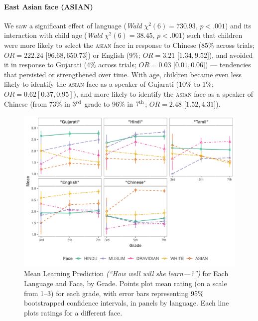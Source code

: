 \documentclass{foushee-adapted-preprint}
\begin{document}
\paragraph*{East Asian face {\small{(ASIAN)}}} 
We saw a significant effect of language (\textit{Wald} $\chi^2(6)=730.93$, $p<.001$) and its interaction with child age (\textit{Wald} $\chi^2(6)=38.45$, $p<.001$) such that children were more likely to select the \textsc{asian} face in response to Chinese (85\% across trials; $OR=222.24$ [$96.68, 650.73]$) or English (9\%; $OR=3.21$ [$1.34, 9.52]$), and avoided it in response to Gujarati (4\% across trials; $OR=0.03$ [$0.01, 0.06]$) --- tendencies that persisted or strengthened over time. With age, children became even less likely to identify the \textsc{asian} face as a speaker of Gujarati (10\% to 1\%; $OR=0.62 [0.37, 0.95]$), and more likely to identify the \textsc{asian} face as a speaker of Chinese (from 73\% in $3^{\textnormal{rd}}$ grade to 96\% in $7^{\textnormal{th}}$; $OR=2.48$ [$1.52, 4.31]$). 
\begin{figure}
    \centering
    \includegraphics[width=1.2\linewidth]{figures/std_plots/learning_faces_std_no_marathi.png}
    \caption{Mean Learning Prediction \emph{(``How well will she learn---?'')} for Each Language and Face, by Grade. Points plot mean rating (on a scale from 1--3) for each grade, with error bars representing 95\% bootstrapped confidence intervals, in panels by language. Each line plots ratings for a different face.}
    \label{fig:faces-learning-score}
\vspace{-7pt}
\end{figure}
\end{document}

